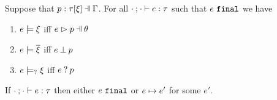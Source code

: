 \begin{lem}
  \label{lemma:const-matching-coherence}
  Suppose that $\cpattyp{p}{\tau}{\xi}{\Gamma}$. For all $\cdot \mathbin{;} \cdot \vdash e : \tau$ such that $e ~\mathtt{final}$ we have
  \begin{enumerate}
    \item $e \models \xi$ iff $\hpatmatch{e}{p}{\theta}$
    \item $e \models \overline{\xi}$ iff $e \mathbin{\bot} p$
    \item $e \models_{?} \xi$ iff $e \mathbin{?} p$
  \end{enumerate}
\end{lem}

\begin{thm}
 \label{thrm:exhau-progress}
 If $\cdot \mathbin{;} \cdot \vdash e : \tau$ then either $e ~\mathtt{final}$ or $e \mapsto e'$ for some $e'$.
\end{thm}


